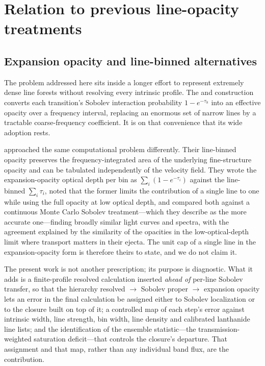 \documentclass[fleqn,usenatbib]{mnras}
\newcommand{\taus}{\tau_{\mathrm{S}}}
\begin{document}
\section{Relation to previous line-opacity treatments}
\label{app:related}

\subsection{Expansion opacity and line-binned alternatives}

The problem addressed here sits inside a longer effort to represent extremely
dense line forests without resolving every intrinsic profile. The
\citet{karp1977} and \citet{eastman1993} construction converts each
transition's Sobolev interaction probability $1-e^{-\taus}$ into an effective
opacity over a frequency interval, replacing an enormous set of narrow lines
by a tractable coarse-frequency coefficient. It is on that convenience that
its wide adoption rests.

\citet{fontes2020} approached the same computational problem differently.
Their line-binned opacity preserves the frequency-integrated area of the
underlying fine-structure opacity and can be tabulated independently of the
velocity field. They wrote the expansion-opacity optical depth per bin as
$\sum_i(1-e^{-\tau_i})$ against the line-binned $\sum_i\tau_i$, noted that the
former limits the contribution of a single line to one while using the full
opacity at low optical depth, and compared both against a continuous Monte
Carlo Sobolev treatment---which they describe as the more accurate
one---finding broadly similar light curves and spectra, with the agreement
explained by the similarity of the opacities in the low-optical-depth limit
where transport matters in their ejecta. The unit cap of a single line in the
expansion-opacity form is therefore theirs to state, and we do not claim it.

The present work is not another prescription; its purpose is diagnostic. What
it adds is a finite-profile resolved calculation inserted \emph{ahead of}
per-line Sobolev transfer, so that the hierarchy resolved $\rightarrow$
Sobolev proper $\rightarrow$ expansion opacity lets an error in the final
calculation be assigned either to Sobolev localization or to the closure built
on top of it; a controlled map of each step's error against intrinsic width,
line strength, bin width, line density and calibrated lanthanide line lists;
and the identification of the ensemble statistic---the transmission-weighted
saturation deficit---that controls the closure's departure. That assignment
and that map, rather than any individual band flux, are the contribution.
\end{document}

